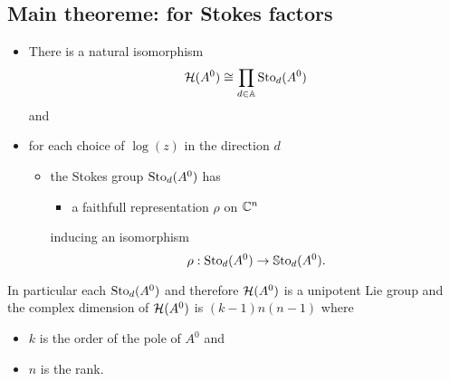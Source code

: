 \subsection{Main theoreme: for Stokes factors}
\begin{thm}
  \begin{itemize}
    \item There is a natural isomorphism
      \[
        \mathcal{H}(A^0)\cong\prod_{d\in\mathbb{A}}\operatorname{Sto}_d(A^0)
      \]
      and
    \item for each choice of $\log(z)$ in the direction $d$
      \begin{itemize}
        \item the Stokes group $\operatorname{Sto}_d(A^0)$ has
          \begin{itemize}
            \item a faithfull representation $\rho$ on $\mathbb{C}^n$
          \end{itemize}
          inducing an isomorphism
          \[
            \rho:\operatorname{Sto}_d(A^0)\to\operatorname{\mathbb{S}to}_d(A^0).
          \]
      \end{itemize}
  \end{itemize}
  In particular each $\operatorname{Sto}_d(A^0)$ and therefore $\mathcal{H}(A^0)$ is a unipotent Lie
  group and the complex dimension of $\mathcal{H}(A^0)$ is $(k-1)n(n-1)$ where
  \begin{itemize}
    \item $k$ is the order of the pole of $A^0$ and
    \item $n$ is the rank.
  \end{itemize}
\end{thm}

